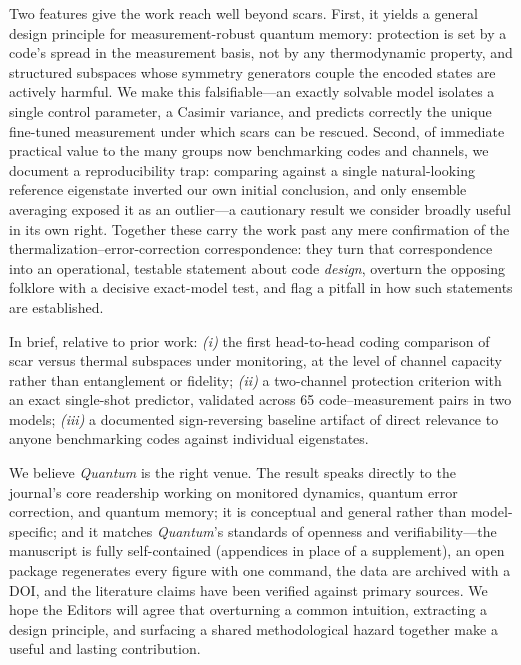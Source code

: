 \documentclass[11pt]{article}
\begin{document}
Two features give the work reach well beyond scars. First, it yields a general
design principle for measurement-robust quantum memory: protection is set by a
code's spread in the measurement basis, not by any thermodynamic property, and
structured subspaces whose symmetry generators couple the encoded states are
actively harmful. We make this falsifiable---an exactly solvable model isolates a
single control parameter, a Casimir variance, and predicts correctly the unique
fine-tuned measurement under which scars can be rescued. Second, of immediate
practical value to the many groups now benchmarking codes and channels, we
document a reproducibility trap: comparing against a single natural-looking
reference eigenstate inverted our own initial conclusion, and only ensemble
averaging exposed it as an outlier---a cautionary result we consider broadly
useful in its own right. Together these carry the work past any mere confirmation
of the thermalization--error-correction correspondence: they turn that
correspondence into an operational, testable statement about code \emph{design},
overturn the opposing folklore with a decisive exact-model test, and flag a
pitfall in how such statements are established.

\noindent In brief, relative to prior work: \emph{(i)} the first head-to-head
coding comparison of scar versus thermal subspaces under monitoring, at the
level of channel capacity rather than entanglement or fidelity; \emph{(ii)} a
two-channel protection criterion with an exact single-shot predictor, validated
across 65 code--measurement pairs in two models; \emph{(iii)} a documented
sign-reversing baseline artifact of direct relevance to anyone benchmarking
codes against individual eigenstates.

\vspace{0.5em}

We believe \emph{Quantum} is the right venue. The result speaks directly to the
journal's core readership working on monitored dynamics, quantum error
correction, and quantum memory; it is conceptual and general rather than
model-specific; and it matches \emph{Quantum}'s standards of openness and
verifiability---the manuscript is fully self-contained (appendices in place of a
supplement), an open package regenerates every figure with one command, the
data are archived with a DOI, and the literature claims have been verified
against primary sources. We hope the Editors will agree that overturning a
common intuition, extracting a design principle, and surfacing a shared
methodological hazard together make a useful and lasting contribution.
\end{document}
